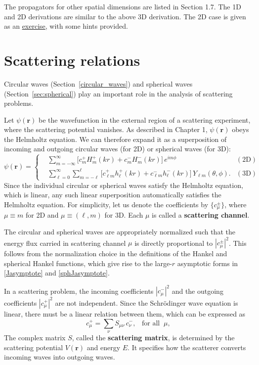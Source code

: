 \documentclass[pra,12pt]{revtex4}
\begin{document}
The propagators for other spatial dimensions are listed in Section
1.7.  The 1D and 2D derivations are similar to the above 3D
derivation.  The 2D case is given as an
\hyperref[ex:2dpropagator]{exercise}, with some hints provided.

\section{Scattering relations}

Circular waves (Section~\ref{circular_waves}) and spherical waves
(Section~\ref{sec:spherical}) play an important role in the analysis
of scattering problems.

Let $\psi(\mathbf{r})$ be the wavefunction in the external region of a
scattering experiment, where the scattering potential vanishes.  As
described in Chapter 1, $\psi(\mathbf{r})$ obeys the Helmholtz
equation.  We can therefore expand it as a superposition of incoming
and outgoing circular waves (for 2D) or spherical waves (for 3D):
\begin{equation}
  \psi(\mathbf{r}) =
  \left\{
  \begin{aligned}
    &\sum_{m=-\infty}^\infty
    \Big[c_m^+ H_m^+(kr) + c_m^- H_m^-(kr)\Big] \, e^{im\phi}
    & (\textrm{2D})
    \\
    &\sum_{\ell = 0}^\infty \sum_{m = - \ell}^\ell
    \Big[c_{\ell m}^+ h_\ell^+(kr) + c_{\ell m}^- h_\ell^-(kr)\Big] \,
    Y_{\ell m}(\theta, \phi). & (\textrm{3D})
  \end{aligned}\right.
\end{equation}
Since the individual circular or spherical waves satisfy the Helmholtz
equation, which is linear, any such linear superposition automatically
satisfies the Helmholtz equation.  For simplicity, let us denote the
coefficients by $\{c_\mu^\pm\}$, where $\mu \equiv m$ for 2D and $\mu
\equiv (\ell, m)$ for 3D.  Each $\mu$ is called a \textbf{scattering
  channel}.

The circular and spherical waves are appropriately normalized such
that the energy flux carried in scattering channel $\mu$ is directly
proportional to $|c_\mu^\pm|^2$.  This follows from the normalization
choice in the definitions of the Hankel and spherical Hankel
functions, which give rise to the large-$r$ asymptotic forms in
\eqref{Jasymptote} and \eqref{sphJasymptote}.

In a scattering problem, the incoming coefficients $|c_\mu^-|^2$ and
the outgoing coefficients $|c_\mu^+|^2$ are not independent.  Since
the Schr\"odinger wave equation is linear, there must be a linear
relation between them, which can be expressed as
\begin{equation}
  c_{\mu}^+ = \sum_{\nu} S_{\mu \nu} \, c_{\nu}^-, \;\;\;\text{for all}\;\;\mu,
\end{equation}
The complex matrix $S$, called the \textbf{scattering matrix}, is
determined by the scattering potential $V(\mathbf{r})$ and energy $E$.
It specifies how the scatterer converts incoming waves into outgoing
waves.
\end{document}
